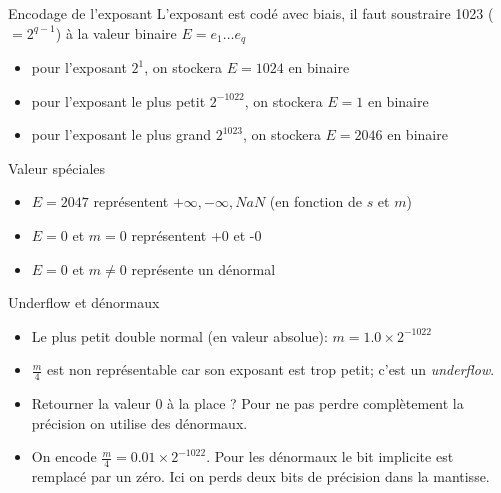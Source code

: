 \documentclass{beamer}
\begin{document}
\begin{frame}{Encodage de l'exposant}
    L'exposant est codé avec biais, il faut soustraire 1023 ($ = 2^{q-1}$) à la valeur binaire $E=e_1\ldots e_q$
    \begin{itemize}
        \item pour l'exposant $2^1$, on stockera $E = 1024$ en binaire
        \item pour l'exposant le plus petit $2^{-1022}$, on stockera $E = 1$ en binaire
        \item pour l'exposant le plus grand $2^{1023}$, on stockera $E = 2046$ en binaire
    \end{itemize}

    \begin{block}{Valeur spéciales}
        \begin{itemize}
            \item $E = 2047$ représentent $+\infty, -\infty, NaN$ (en fonction de $s$ et $m$)
            \item $E = 0$ et $m = 0$ représentent +0 et -0
            \item $E = 0$ et $m \neq 0$ représente un dénormal
        \end{itemize}
    \end{block}
\end{frame}

\begin{frame}{Underflow et dénormaux}

    \begin{itemize}
        \item Le plus petit double normal (en valeur absolue): $ m = 1.0 \times 2^{-1022} $
        \item $\frac{m}{4}$ est non représentable car son exposant est trop petit; c'est un \emph{underflow}.
        \item Retourner la valeur $0$ à la place ? Pour ne pas
              perdre complètement la précision on utilise des dénormaux.
        \item On encode $ \frac{m}{4} = 0.01 \times 2^{-1022} $. Pour les dénormaux le bit implicite est remplacé par un zéro. Ici on perds deux bits de précision dans la mantisse.
    \end{itemize}
\end{frame}
\end{document}
